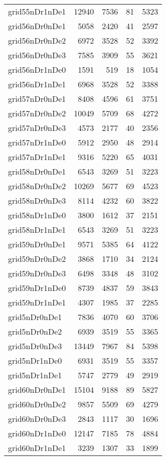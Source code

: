 \begin{longtable}{lrrrr}
grid55nDr1nDe1 & 12940 & 7536 & 81 & 5323 \\
grid56nDr0nDe1 & 5058 & 2420 & 41 & 2597 \\
grid56nDr0nDe2 & 6972 & 3528 & 52 & 3392 \\
grid56nDr0nDe3 & 7585 & 3909 & 55 & 3621 \\
grid56nDr1nDe0 & 1591 & 519 & 18 & 1054 \\
grid56nDr1nDe1 & 6968 & 3528 & 52 & 3388 \\
grid57nDr0nDe1 & 8408 & 4596 & 61 & 3751 \\
grid57nDr0nDe2 & 10049 & 5709 & 68 & 4272 \\
grid57nDr0nDe3 & 4573 & 2177 & 40 & 2356 \\
grid57nDr1nDe0 & 5912 & 2950 & 48 & 2914 \\
grid57nDr1nDe1 & 9316 & 5220 & 65 & 4031 \\
grid58nDr0nDe1 & 6543 & 3269 & 51 & 3223 \\
grid58nDr0nDe2 & 10269 & 5677 & 69 & 4523 \\
grid58nDr0nDe3 & 8114 & 4232 & 60 & 3822 \\
grid58nDr1nDe0 & 3800 & 1612 & 37 & 2151 \\
grid58nDr1nDe1 & 6543 & 3269 & 51 & 3223 \\
grid59nDr0nDe1 & 9571 & 5385 & 64 & 4122 \\
grid59nDr0nDe2 & 3868 & 1710 & 34 & 2124 \\
grid59nDr0nDe3 & 6498 & 3348 & 48 & 3102 \\
grid59nDr1nDe0 & 8739 & 4837 & 59 & 3843 \\
grid59nDr1nDe1 & 4307 & 1985 & 37 & 2285 \\
grid5nDr0nDe1 & 7836 & 4070 & 60 & 3706 \\
grid5nDr0nDe2 & 6939 & 3519 & 55 & 3365 \\
grid5nDr0nDe3 & 13449 & 7967 & 84 & 5398 \\
grid5nDr1nDe0 & 6931 & 3519 & 55 & 3357 \\
grid5nDr1nDe1 & 5747 & 2779 & 49 & 2919 \\
grid60nDr0nDe1 & 15104 & 9188 & 89 & 5827 \\
grid60nDr0nDe2 & 9857 & 5509 & 69 & 4279 \\
grid60nDr0nDe3 & 2843 & 1117 & 30 & 1696 \\
grid60nDr1nDe0 & 12147 & 7185 & 78 & 4884 \\
grid60nDr1nDe1 & 3239 & 1307 & 33 & 1899 \\

\end{longtable}
